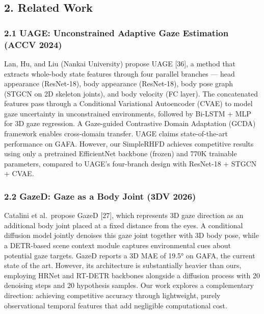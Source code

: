 \documentclass[
]{article}
\begin{document}
\hypertarget{related-work}{%
\subsection{2. Related Work}\label{related-work}}

\hypertarget{uage-unconstrained-adaptive-gaze-estimation-accv-2024}{%
\subsubsection{2.1 UAGE: Unconstrained Adaptive Gaze Estimation (ACCV
2024)}\label{uage-unconstrained-adaptive-gaze-estimation-accv-2024}}

Lan, Hu, and Liu (Nankai University) propose UAGE {[}36{]}, a method
that extracts whole-body state features through four parallel branches
--- head appearance (ResNet-18), body appearance (ResNet-18), body pose
graph (STGCN on 2D skeleton joints), and body velocity (FC layer). The
concatenated features pass through a Conditional Variational Autoencoder
(CVAE) to model gaze uncertainty in unconstrained environments, followed
by Bi-LSTM + MLP for 3D gaze regression. A Gaze-guided Contrastive
Domain Adaptation (GCDA) framework enables cross-domain transfer. UAGE
claims state-of-the-art performance on GAFA. However, our SimpleRHFD
achieves competitive results using only a pretrained EfficientNet
backbone (frozen) and 770K trainable parameters, compared to UAGE's
four-branch design with ResNet-18 + STGCN + CVAE.

\hypertarget{gazed-gaze-as-a-body-joint-3dv-2026}{%
\subsubsection{2.2 GazeD: Gaze as a Body Joint (3DV
2026)}\label{gazed-gaze-as-a-body-joint-3dv-2026}}

Catalini et al.~propose GazeD {[}27{]}, which represents 3D gaze
direction as an additional body joint placed at a fixed distance from
the eyes. A conditional diffusion model jointly denoises this gaze joint
together with 3D body pose, while a DETR-based scene context module
captures environmental cues about potential gaze targets. GazeD reports
a 3D MAE of 19.5° on GAFA, the current state of the art. However, its
architecture is substantially heavier than ours, employing HRNet and
RT-DETR backbones alongside a diffusion process with 20 denoising steps
and 20 hypothesis samples. Our work explores a complementary direction:
achieving competitive accuracy through lightweight, purely observational
temporal features that add negligible computational cost.
\end{document}
